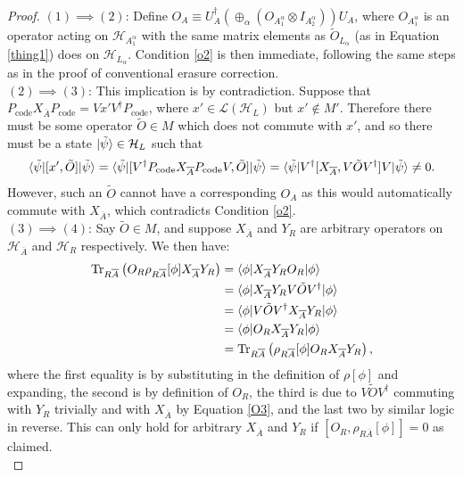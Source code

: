 \documentclass[12pt,a4paper]{report}
\numberwithin{equation}{section}
\newcommand{\Pc}{P_{\text{code}}}
\newcommand{\ol}[1]{\overline{#1}}
\newcommand{\tr}{\text{Tr}}
\theoremstyle{definition}
\theoremstyle{theorem}
\theoremstyle{theorem}
\theoremstyle{example}
\theoremstyle{definition}
\begin{document}
\begin{proof}
	$(1)\implies (2)$: Define $O_{A}\equiv U_{A}^{\dagger}(\oplus_{\alpha}(O_{A_{1}^{\alpha}}\otimes I_{A_{2}^{\alpha}}))U_{A}$, where $O_{A_{1}^{\alpha}}$ is an operator acting on $\mathcal{H}_{A_{1}^{\alpha}}$ with the same matrix elements as $\tilde{O}_{L_{\alpha}}$ (as in Equation \ref{thing1}) does on $\mathcal{H}_{L_{\alpha}}$. Condition \ref{o2} is then immediate, following the same steps as in the proof of conventional erasure correction.\\
	$(2)\implies (3)$: This implication is by contradiction. Suppose that $\Pc X_{\ol{A}}\Pc=Vx'V^{\dagger}\Pc$, where $x'\in\mathcal{L}(\mathcal{H}_{L})$ but $x'\notin M'$. Therefore there must be some operator $\tilde{O}\in M$ which does not commute with $x'$, and so there must be a state $\ket{\tilde{\psi}}\in\mathcal{H}_{L}$ such that
	\begin{equation}
		\braket{\tilde{\psi}|[x',\tilde{O}]|\tilde{\psi}}=\braket{\tilde{\psi}|[V^{\dagger}\Pc X_{\ol{A}}\Pc V,\tilde{O}]|\tilde{\psi}}=\braket{\tilde{\psi}|V^{\dagger}[X_{\ol{A}},V\tilde{O}V^{\dagger}]V|\tilde{\psi}}\neq 0.
	\end{equation}
	However, such an $\tilde{O}$ cannot have a corresponding $O_{A}$ as this would automatically commute with $X_{\ol{A}}$, which contradicts Condition \ref{o2}.\\
	$(3)\implies (4)$: Say $\tilde{O}\in M$, and suppose $X_{\ol{A}}$ and $Y_{R}$ are arbitrary operators on $\mathcal{H}_{\ol{A}}$ and $\mathcal{H}_{R}$ respectively. We then have:
	\begin{equation}
		\begin{aligned}
			\tr_{R\ol{A}}\left(O_{R}\rho_{R\ol{A}}[\phi]X_{\ol{A}}Y_{R}\right)&=\braket{\phi|X_{\ol{A}}Y_{R}O_{R}|\phi}\\&=\braket{\phi|X_{\ol{A}}Y_{R}V\tilde{O}V^{\dagger}|\phi}\\&=\braket{\phi|V\tilde{O}V^{\dagger}X_{\ol{A}}Y_{R}|\phi}\\&=\braket{\phi|O_{R}X_{\ol{A}}Y_{R}|\phi}\\&=\tr_{R\ol{A}}\left(\rho_{R\ol{A}}[\phi]O_{R}X_{\ol{A}}Y_{R}\right),
		\end{aligned}
	\end{equation}
	where the first equality is by substituting in the definition of $\rho[\phi]$ and expanding, the second is by definition of $O_{R}$, the third is due to $V\tilde{O}V^{\dagger}$ commuting with $Y_{R}$ trivially and with $X_{\ol{A}}$ by Equation \ref{O3}, and the last two by similar logic in reverse. This can only hold for arbitrary $X_{\ol{A}}$ and $Y_{R}$ if $[O_{R},\rho_{R\ol{A}}[\phi]]=0$ as claimed.\\

\end{proof}
\end{document}
